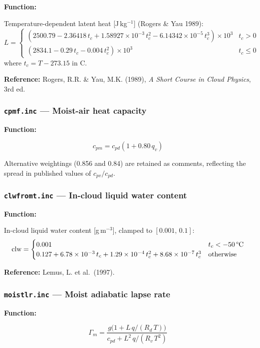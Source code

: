 \textbf{Function:} 

Temperature-dependent latent heat [J\,kg$^{-1}$] (Rogers \& Yau 1989):
\[
  L =
  \begin{cases}
    (2500.79 - 2.36418\,t_c + 1.58927\times10^{-3}\,t_c^2
      - 6.14342\times10^{-5}\,t_c^3)\times10^3 & t_c > 0 \\
    (2834.1 - 0.29\,t_c - 0.004\,t_c^2)\times10^3 & t_c \leq 0
  \end{cases}
\]
where $t_c = T - 273.15$ in \textdegree C.

\textbf{Reference:} Rogers, R.R. \& Yau, M.K. (1989),
\textit{A Short Course in Cloud Physics}, 3rd ed.

\subsubsection{\texttt{cpmf.inc} --- Moist-air heat capacity}

\textbf{Function:} 

\[
  c_{pm} = c_{pd}(1 + 0.80\,q_v)
\]

Alternative weightings (0.856 and 0.84) are retained as comments, reflecting
the spread in published values of $c_{pv}/c_{pd}$.

\subsubsection{\texttt{clwfromt.inc} --- In-cloud liquid water content}

\textbf{Function:} 

In-cloud liquid water content [g\,m$^{-3}$], clamped to $[0.001,\,0.1]$:
\[
  \text{clw} =
  \begin{cases}
    0.001 & t_c < -50\,\text{\textdegree C} \\
    0.127 + 6.78\times10^{-3}\,t_c + 1.29\times10^{-4}\,t_c^2
         + 8.68\times10^{-7}\,t_c^3 & \text{otherwise}
  \end{cases}
\]

\textbf{Reference:} Lemus, L. et al.\ (1997).

\subsubsection{\texttt{moistlr.inc} --- Moist adiabatic lapse rate}

\textbf{Function:} 

\[
  \Gamma_m = \frac{g\bigl(1 + L\,q/(R_d\,T)\bigr)}
                  {c_{pd} + L^2\,q/(R_v\,T^2)}
\]

